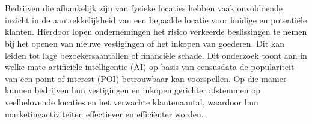 
%
%
%
%
%

%



\chapter*{}

Bedrijven die afhankelijk zijn van fysieke locaties hebben vaak onvoldoende inzicht in de aantrekkelijkheid van een bepaalde locatie voor huidige en potentiële klanten. Hierdoor lopen ondernemingen het risico verkeerde beslissingen te nemen bij het openen van nieuwe vestigingen of het inkopen van goederen. Dit kan leiden tot lage bezoekersaantallen of financiële schade. Dit onderzoek toont aan in welke mate artificiële intelligentie (AI) op basis van censusdata de populariteit van een point-of-interest (POI) betrouwbaar kan voorspellen. Op die manier kunnen bedrijven hun vestigingen en inkopen gerichter afstemmen op veelbelovende locaties en het verwachte klantenaantal, waardoor hun marketingactiviteiten effectiever en efficiënter worden.


